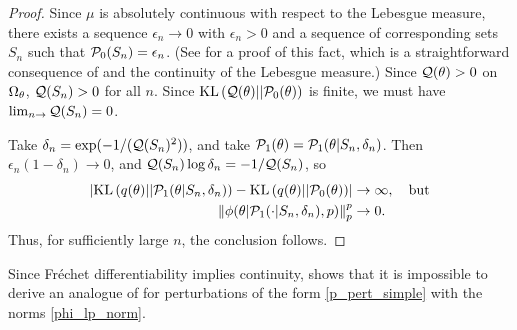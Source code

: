 \begin{thm}
\begin{proof}
Since $\mu$ is absolutely continuous with respect to the Lebesgue measure, there
exists a sequence $\epsilon_n \rightarrow 0$ with $\epsilon_n > 0$ and a
sequence of corresponding sets $S_n$ such that $\mathcal{P}_{0}(S_n) = \epsilon_n$. (See
 for a proof of this fact, which is a
straightforward consequence of \citet[Proposition 15.5]{nielsen:1997:measure}
and the continuity of the Lebesgue measure.) Since $\mathcal{Q}(\theta) > 0$ on
$\Omega_{\theta}$, $\mathcal{Q}(S_n) > 0$ for all $n$.  Since $\mathrm{KL}\left(\mathcal{Q}(\theta) ||
\mathcal{P}_{0}(\theta)\right)$ is finite, we must have $\lim_{n \rightarrow} \mathcal{Q}(S_n) = 0$.

Take $\delta_n  = \exp(-1 / (\mathcal{Q}(S_n)^2))$, and take $\mathcal{P}_{1}(\theta) =
\mathcal{P}_{1}(\theta \vert S_n, \delta_n)$.  Then $\epsilon_n (1 - \delta_n) \rightarrow
0$, and $\mathcal{Q}(S_n)\log \delta_n = -1 / \mathcal{Q}(S_n)$, so
%
\begin{align*}
%
\abs{\KL{q(\theta) || \palt(\theta \vert S_n, \delta_n)} -
    \KL{q(\theta) || \pbase(\theta)}} \rightarrow{}& \infty, \quad \textrm{but}\\
%
\norm{\phi(\theta \vert \palt(\cdot \vert S_n, \delta_n), p)}_p^p
    \rightarrow{}& 0.
%
\end{align*}
%
Thus, for sufficiently large $n$, the conclusion follows.
%
\end{proof}
%
\end{thm}

Since Fr{\'e}chet differentiability implies continuity,
 shows that it is impossible to derive an analogue of
 for perturbations of the form \eqref{p_pert_simple}
with the norms \eqref{phi_lp_norm}.

